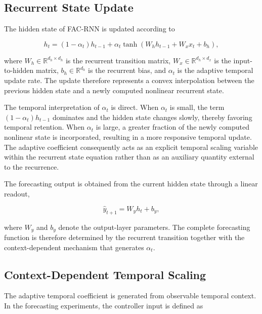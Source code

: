 \documentclass[journal]{IEEEtran}
\begin{document}
\subsection{Recurrent State Update}
\label{subsec:state_update}

The hidden state of FAC-RNN is updated according to

\begin{equation}
	h_t
	=
	(1-\alpha_t)h_{t-1}
	+
	\alpha_t
	\tanh
	\left(
	W_hh_{t-1}+W_xx_t+b_h
	\right),
	\label{eq:fac_update}
\end{equation}

where $W_h\in\mathbb{R}^{d_h\times d_h}$ is the recurrent transition matrix, $W_x\in\mathbb{R}^{d_h\times d_x}$ is the input-to-hidden matrix, $b_h\in\mathbb{R}^{d_h}$ is the recurrent bias, and $\alpha_t$ is the adaptive temporal update rate. The update therefore represents a convex interpolation between the previous hidden state and a newly computed nonlinear recurrent state.

The temporal interpretation of $\alpha_t$ is direct. When $\alpha_t$ is small, the term $(1-\alpha_t)h_{t-1}$ dominates and the hidden state changes slowly, thereby favoring temporal retention. When $\alpha_t$ is large, a greater fraction of the newly computed nonlinear state is incorporated, resulting in a more responsive temporal update. The adaptive coefficient consequently acts as an explicit temporal scaling variable within the recurrent state equation rather than as an auxiliary quantity external to the recurrence.

The forecasting output is obtained from the current hidden state through a linear readout,

\begin{equation}
	\hat{y}_{t+1}
	=
	W_yh_t+b_y,
	\label{eq:fac_output}
\end{equation}

where $W_y$ and $b_y$ denote the output-layer parameters. The complete forecasting function is therefore determined by the recurrent transition together with the context-dependent mechanism that generates $\alpha_t$.

\subsection{Context-Dependent Temporal Scaling}
\label{subsec:temporal_scaling}

The adaptive temporal coefficient is generated from observable temporal context. In the forecasting experiments, the controller input is defined as
\end{document}
